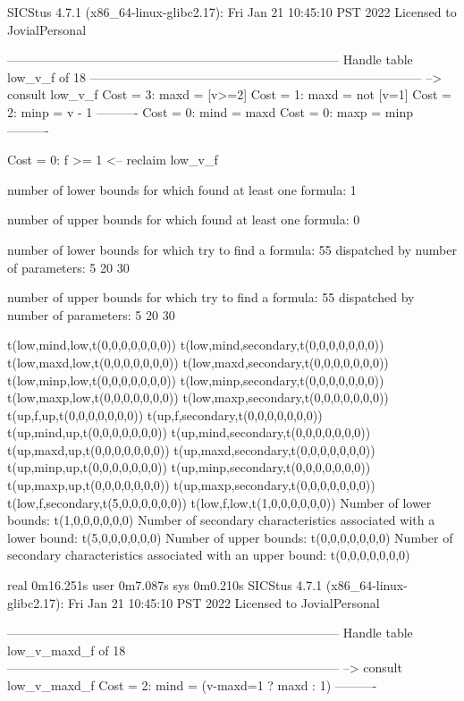 SICStus 4.7.1 (x86_64-linux-glibc2.17): Fri Jan 21 10:45:10 PST 2022
Licensed to JovialPersonal


--------------------------------------------------------------------------------
Handle table low_v_f of 18
--------------------------------------------------------------------------------
--> consult low_v_f
Cost =  3:  maxd = [v>=2]
Cost =  1:  maxd = not [v=1]
Cost =  2:  minp = v - 1
----------
Cost =  0:  mind = maxd
Cost =  0:  maxp = minp
----------

Cost =  0:  f >= 1
<-- reclaim low_v_f

number of lower bounds for which found at least one formula: 1

number of upper bounds for which found at least one formula: 0

number of lower bounds for which try to find a formula: 55
dispatched by number of parameters: 5  20  30

number of upper bounds for which try to find a formula: 55
dispatched by number of parameters: 5  20  30

t(low,mind,low,t(0,0,0,0,0,0,0))
t(low,mind,secondary,t(0,0,0,0,0,0,0))
t(low,maxd,low,t(0,0,0,0,0,0,0))
t(low,maxd,secondary,t(0,0,0,0,0,0,0))
t(low,minp,low,t(0,0,0,0,0,0,0))
t(low,minp,secondary,t(0,0,0,0,0,0,0))
t(low,maxp,low,t(0,0,0,0,0,0,0))
t(low,maxp,secondary,t(0,0,0,0,0,0,0))
t(up,f,up,t(0,0,0,0,0,0,0))
t(up,f,secondary,t(0,0,0,0,0,0,0))
t(up,mind,up,t(0,0,0,0,0,0,0))
t(up,mind,secondary,t(0,0,0,0,0,0,0))
t(up,maxd,up,t(0,0,0,0,0,0,0))
t(up,maxd,secondary,t(0,0,0,0,0,0,0))
t(up,minp,up,t(0,0,0,0,0,0,0))
t(up,minp,secondary,t(0,0,0,0,0,0,0))
t(up,maxp,up,t(0,0,0,0,0,0,0))
t(up,maxp,secondary,t(0,0,0,0,0,0,0))
t(low,f,secondary,t(5,0,0,0,0,0,0))
t(low,f,low,t(1,0,0,0,0,0,0))
Number of lower bounds:                                             t(1,0,0,0,0,0,0)
Number of secondary characteristics associated with a lower bound:  t(5,0,0,0,0,0,0)
Number of upper bounds:                                             t(0,0,0,0,0,0,0)
Number of secondary characteristics associated with an upper bound: t(0,0,0,0,0,0,0)

real	0m16.251s
user	0m7.087s
sys	0m0.210s
SICStus 4.7.1 (x86_64-linux-glibc2.17): Fri Jan 21 10:45:10 PST 2022
Licensed to JovialPersonal


--------------------------------------------------------------------------------
Handle table low_v_maxd_f of 18
--------------------------------------------------------------------------------
--> consult low_v_maxd_f
Cost =  2:  mind = (v-maxd=1 ? maxd : 1)
----------

